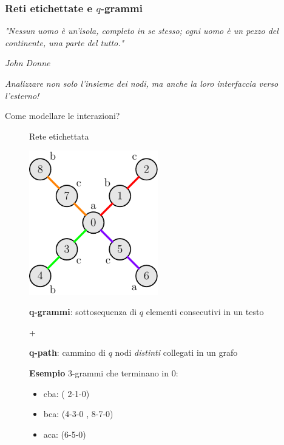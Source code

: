 \begin{frame}
	\frametitle{Reti etichettate e $q$-grammi}
	
	\textit{"Nessun uomo è un'isola, completo in se stesso; ogni uomo è un pezzo del continente, una parte del tutto."}
	\begin{flushright}
		\small \textit{John Donne}
	\end{flushright}
	
	\centering
	\textit{Analizzare non solo l'insieme dei nodi, ma anche la loro interfaccia verso l'esterno!}\\
	
	\pause
	
	Come modellare le interazioni?\\
	
	\pause
	
	\begin{figure}[h]
		\centering
		\begin{minipage}[t]{.49\textwidth}
			\centering
			Rete etichettata\medskip
			
			\includegraphics[width=0.5\textwidth]{images/11_labeled}
		\end{minipage}\hfill
		\pause
		\begin{minipage}[t]{.49\textwidth}
			
			\centering
			
			\textbf{q-grammi}: sottosequenza di $q$ elementi consecutivi in un testo
			
			+
			
			\textbf{q-path}: cammino di $q$ nodi \textit{distinti} collegati in un grafo \bigskip
			
			\small\pause
			
			\textbf{Esempio} $3$-grammi che terminano in $0$:
			\begin{itemize}
				\item cba: (\color{red} 2-1-0\color{black})
				\item bca: (\color{green}4-3-0 \color{black}, \color{orange}8-7-0\color{black})
				\item aca: (\color{violet}6-5-0\color{black})
			\end{itemize}
		\end{minipage}
	\end{figure}

	
\end{frame}


